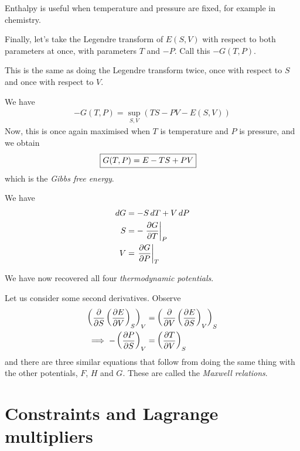 \documentclass{../template/note}
\begin{document}
    \begin{remark*}
        Enthalpy is useful when temperature and pressure are fixed, for example in chemistry.
    \end{remark*}
    
    Finally, let's take the Legendre transform of $E(S, V)$ with respect to both parameters at once, with parameters $T$ and $-P$. Call this $-G(T, P)$.

    \begin{remark*}
        This is the same as doing the Legendre transform twice, once with respect to $S$ and once with respect to $V$.
    \end{remark*}
    
    We have
    \begin{align*}
        -G(T, P) = \sup_{S, V} \left(TS-PV-E(S, V)\right)
    \end{align*}
    Now, this is once again maximised when $T$ is temperature and $P$ is pressure, and we obtain
    \begin{align*}
        \Aboxed{G(T, P) = E - TS + PV}
    \end{align*}
    which is the \emph{Gibbs free energy}.
    
    \begin{proposition}
        We have
        \begin{align*}
            dG &= -S \D T + V \D P \\
            S &= -\pd[P]{G}{T} \\
            V &= \pd[T]{G}{P}
        \end{align*}
    \end{proposition}
    
    We have now recovered all four \emph{thermodynamic potentials}.
    

    Let us consider some second derivatives. Observe
    \begin{align*}
        \left(\pd{}{S}\left(\pd{E}{V}\right)_S\right)_V &= \left(\pd{}{V}\left(\pd{E}{S}\right)_V\right)_S \\
        \implies -\left(\pd{P}{S}\right)_V &= \left(\pd{T}{V}\right)_S
    \end{align*}
    and there are three similar equations that follow from doing the same thing with the other potentials, $F$, $H$ and $G$. These are called the \emph{Maxwell relations}.
    
    \section{Constraints and Lagrange multipliers}
\end{document}
